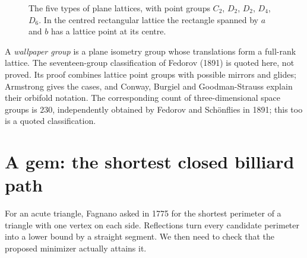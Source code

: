\begin{figure}[ht]
\centering
{}
\caption{The five types of plane lattices, with point groups $C_2$, $D_2$, $D_2$, $D_4$, $D_6$. In the centred rectangular lattice the
rectangle spanned by $a$ and $b$ has a lattice point at its centre.}
\label{geometry:fig:lattices}
\end{figure}

\begin{remark}
A \emph{wallpaper group} is a plane isometry group whose translations form a full-rank lattice. The seventeen-group classification of Fedorov (1891) is quoted here, not proved. Its proof combines lattice point groups with possible mirrors and glides; Armstrong gives the cases, and Conway, Burgiel and Goodman-Strauss explain their orbifold notation. The corresponding count of three-dimensional space groups is $230$, independently obtained by Fedorov and Sch\"onflies in 1891; this too is a quoted classification.
\end{remark}

\section{A gem: the shortest closed billiard path}

For an acute triangle, Fagnano asked in 1775 for the shortest perimeter of a triangle with one vertex on each side. Reflections turn every candidate perimeter into a lower bound by a straight segment. We then need to check that the proposed minimizer actually attains it.

